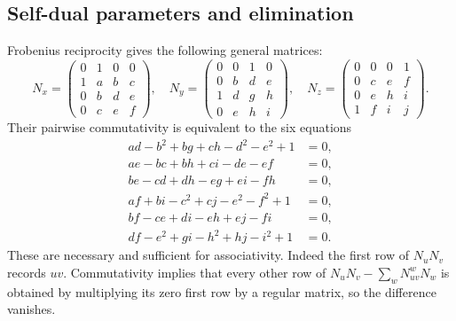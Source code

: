 \documentclass[11pt,a4paper]{article}
\theoremstyle{definition}\newtheorem{definition}[theorem]{Definition}\newtheorem{remark}[theorem]{Remark}
\begin{document}
\subsection{Self-dual parameters and elimination}
Frobenius reciprocity gives the following general matrices:
\[
N_x=\begin{pmatrix}0&1&0&0\\1&a&b&c\\0&b&d&e\\0&c&e&f\end{pmatrix},\quad
N_y=\begin{pmatrix}0&0&1&0\\0&b&d&e\\1&d&g&h\\0&e&h&i\end{pmatrix},\quad
N_z=\begin{pmatrix}0&0&0&1\\0&c&e&f\\0&e&h&i\\1&f&i&j\end{pmatrix}.
\]
Their pairwise commutativity is equivalent to the six equations
\begin{align}
 ad-b^2+bg+ch-d^2-e^2+1&=0,\label{eq:census1}\\
 ae-bc+bh+ci-de-ef&=0,\label{eq:census2}\\
 be-cd+dh-eg+ei-fh&=0,\label{eq:census3}\\
 af+bi-c^2+cj-e^2-f^2+1&=0,\label{eq:census4}\\
 bf-ce+di-eh+ej-fi&=0,\label{eq:census5}\\
 df-e^2+gi-h^2+hj-i^2+1&=0.\label{eq:census6}
\end{align}
These are necessary and sufficient for associativity. Indeed the first
row of $N_uN_v$ records $uv$. Commutativity implies that every other row
of $N_uN_v-\sum_wN_{uv}^wN_w$ is obtained by multiplying its zero first
row by a regular matrix, so the difference vanishes.
\end{document}
